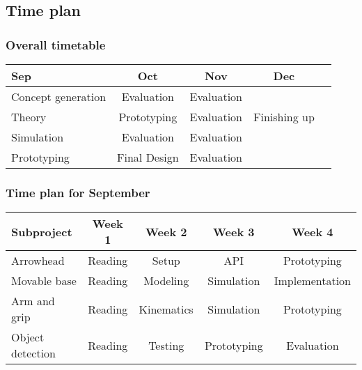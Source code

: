 \begin{frame}
    \subsection{Time plan}
    \frametitle{Overall timetable}
    \begin{table}
        \begin{tabular}{| l | c | c | c | c }
            
            Sep & Oct & Nov & Dec \\
            \hline \hline
            Concept generation & Evaluation & Evaluation &  \\ 
            \hline
            Theory & Prototyping & Evaluation & Finishing up \\
            \hline
            Simulation & Evaluation & Evaluation & \\
            \hline
            Prototyping & Final Design & Evaluation &  \\
            \hline
 
        \end{tabular}
    \end{table}    
\end{frame}


\begin{frame}
    \frametitle{Time plan for September}
    \begin{table}
        \begin{tabular}{l | c | c | c | c }
        Subproject & Week 1 & Week 2 & Week 3 & Week 4 \\
        \hline \hline
            Arrowhead & Reading& Setup & API & Prototyping\\
            Movable base & Reading& Modeling & Simulation & Implementation\\
            Arm and grip  & Reading & Kinematics & Simulation& Prototyping\\
            Object detection & Reading & Testing & Prototyping & Evaluation\\
        \end{tabular}
    \end{table}
\end{frame}